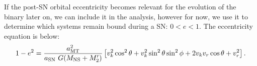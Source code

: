 \documentclass[12pt, preprint]{aastex}
\begin{document}
If the post-SN orbital eccentricity becomes relevant for the evolution of the binary later on, we can include it in the analysis, however for now, we use it to determine which systems remain bound during a SN: $0 < e < 1$. The eccentricity equation is below:
\begin{equation}
1-e^2 = \frac{a_{\rm MT}^2}{a_{\rm SN}\ G (M_{\rm NS} + M_2')} \left[ v_k^2 \cos^2\theta + v_k^2 \sin^2 \theta \sin^2 \phi + 2 v_k v_r \cos \theta + v_r^2  \right]. \label{eq:SN_e}
\end{equation}

\end{document}
